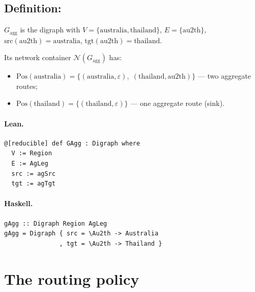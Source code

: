 \documentclass[11pt,a4paper]{article}
\begin{document}
\subsection{Definition: }

\begin{defn}
$G_{\mathrm{agg}}$ is the digraph with $V = \{\mathrm{australia},
\mathrm{thailand}\}$, $E = \{\mathrm{au2th}\}$, $\mathrm{src}(\mathrm{au2th})
= \mathrm{australia}$, $\mathrm{tgt}(\mathrm{au2th}) = \mathrm{thailand}$.

Its network container $\mathcal{N}(G_{\mathrm{agg}})$ has:
\begin{itemize}
  \item $\mathrm{Pos}(\mathrm{australia}) = \{(\mathrm{australia}, \varepsilon),\;
    (\mathrm{thailand}, \mathrm{au2th})\}$ --- two aggregate routes;
  \item $\mathrm{Pos}(\mathrm{thailand}) = \{(\mathrm{thailand}, \varepsilon)\}$
    --- one aggregate route (sink).
\end{itemize}
\end{defn}

\paragraph{Lean.}
\begin{lstlisting}[style=lean]
@[reducible] def GAgg : Digraph where
  V := Region
  E := AgLeg
  src := agSrc
  tgt := agTgt
\end{lstlisting}

\paragraph{Haskell.}
\begin{lstlisting}[style=haskell]
gAgg :: Digraph Region AgLeg
gAgg = Digraph { src = \Au2th -> Australia
               , tgt = \Au2th -> Thailand }
\end{lstlisting}


\section{The routing policy}

\end{document}
